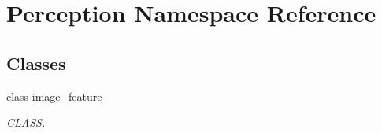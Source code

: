\hypertarget{namespacePerception}{}\section{Perception Namespace Reference}
\label{namespacePerception}
\subsection*{Classes}
\begin{DoxyCompactItemize}
\item 
class \hyperlink{classPerception_1_1image__feature}{image\+\_\+feature}
\begin{DoxyCompactList}\small\item\em C\+L\+A\+SS. \end{DoxyCompactList}\end{DoxyCompactItemize}
